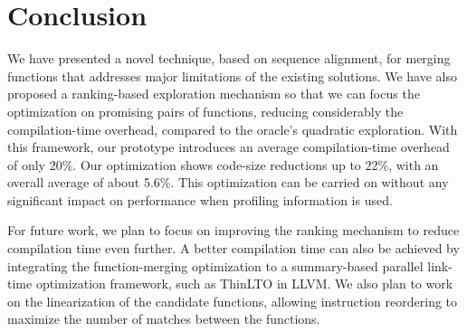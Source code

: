 \vspace{-2ex}
\section{Conclusion}

We have presented a novel technique, based on sequence alignment, for merging
functions that addresses major limitations of the existing solutions.
We have also proposed a ranking-based exploration mechanism so that we can focus
the optimization on promising pairs of functions, reducing considerably the
compilation-time overhead, compared to the oracle's quadratic exploration.
With this framework, our prototype introduces an average
compilation-time overhead of only 20\%.
Our optimization shows code-size reductions up to 22\%, with an overall average
of about 5.6\%.
This optimization can be carried on without any significant impact on
performance when profiling information is used.


For future work, we plan to focus on improving the ranking mechanism to reduce
compilation time even further.
A better compilation time can also be achieved by integrating the
function-merging optimization to a summary-based parallel link-time optimization
framework, such as ThinLTO in LLVM.
We also plan to work on the linearization of the candidate functions, allowing
instruction reordering to maximize the number of matches between the functions.


